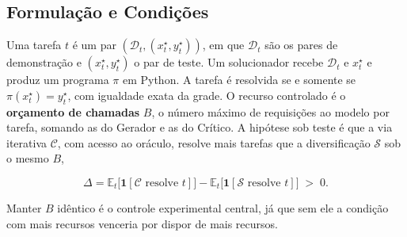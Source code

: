 \documentclass[letterpaper]{article} %
\begin{document}
\subsection{Formulação e Condições}

Uma tarefa $t$ é um par $(\mathcal{D}_t, (x^\star_t, y^\star_t))$, em que
$\mathcal{D}_t$ são os pares de demonstração e $(x^\star_t, y^\star_t)$ o par de
teste. Um solucionador recebe $\mathcal{D}_t$ e $x^\star_t$ e produz um programa
$\pi$ em Python. A tarefa é resolvida se e somente se
$\pi(x^\star_t) = y^\star_t$, com igualdade exata da grade. O recurso controlado
é o \textbf{orçamento de chamadas} $B$, o número máximo de requisições ao modelo
por tarefa, somando as do Gerador e as do Crítico. A hipótese sob teste é que a
via iterativa $\mathcal{C}$, com acesso ao oráculo, resolve mais tarefas que a
diversificação $\mathcal{S}$ sob o mesmo $B$,

\begin{equation}
\Delta = \mathbb{E}_{t}\big[\mathbf{1}[\mathcal{C} \text{ resolve } t]\big]
       - \mathbb{E}_{t}\big[\mathbf{1}[\mathcal{S} \text{ resolve } t]\big]
\;>\; 0 .
\label{eq:delta}
\end{equation}

\noindent Manter $B$ idêntico é o controle experimental central, já que sem ele a
condição com mais recursos venceria por dispor de mais recursos.
\end{document}

